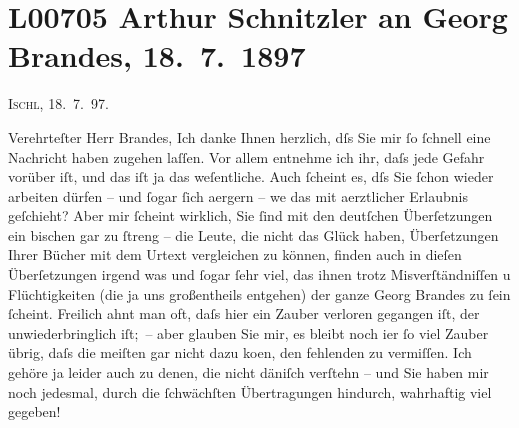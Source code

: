 

\section[Arthur Schnitzler an Georg Brandes, 18. 7. 1897]{L00705 Arthur Schnitzler an Georg Brandes, 18. 7. 1897}
\nopagebreak{}
\rehead{ }\normalsize\beginnumbering{}
\toendnotes[C]{\smallbreak\pagebreak[2]}
\pstart
           \raggedleft{}{\pb}\textsc{Ischl}, 18. 7. 97. \pend
           
\pstart{}Verehrteſter Herr Brandes,\pend\vspace{0.5em}
\pstart
           Ich danke Ihnen herzlich, dſs Sie mir ſo ſchnell eine Nachricht haben zugehen laſſen.
               Vor allem entnehme ich ihr, daſs jede Gefahr vorüber iſt, und das iſt ja das
               weſentliche. Auch ſcheint es, dſs Sie ſchon wieder arbeiten dürfen – und ſogar ſich
               aergern – we{\geminationn} das mit aerztlicher {\pb}Erlaubnis geſchieht? Aber mir ſcheint wirklich,
               Sie ſind mit den deutſchen Überſetzungen ein bischen gar zu ſtreng – die Leute, die
               nicht das Glück haben, Überſetzungen Ihrer Bücher mit dem Urtext vergleichen zu
               können, finden auch in dieſen Überſetzungen irgend was und ſogar ſehr viel, das \introOben{}ihnen\introOben{} trotz Misverſtändniſſen u Flüchtigkeiten (die ja uns
                  \introOben{}großentheils\introOben{} entgehen) der ganze Georg Brandes zu ſein
               ſcheint. {\pb}Freilich ahnt man oft, daſs hier ein
               Zauber verloren gegangen iſt, der unwiederbringlich iſt; – aber glauben Sie mir, es
               bleibt noch i{\geminationm}er ſo viel Zauber übrig, daſs die meiſten
               gar nicht dazu ko{\geminationm}en, den fehlenden zu vermiſſen. Ich
               gehöre ja leider auch zu denen, die nicht däniſch verſtehn – und Sie haben mir noch jedesmal, durch die ſchwächſten
               Übertragungen hindurch, wahrhaftig {\pb}viel
               gegeben!\pend
           
